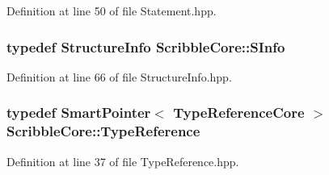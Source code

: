 Definition at line 50 of file Statement.\-hpp.

\hypertarget{namespace_scribble_core_a3a14a97bb67cd5efa082d8dda7595cca}{
\subsubsection[{S\-Info}]{\setlength{\rightskip}{0pt plus 5cm}typedef {\bf Structure\-Info} {\bf Scribble\-Core\-::\-S\-Info}}}\label{namespace_scribble_core_a3a14a97bb67cd5efa082d8dda7595cca}


Definition at line 66 of file Structure\-Info.\-hpp.

\hypertarget{namespace_scribble_core_a0e685a305b14aa5f0504df1369ba270b}{
\subsubsection[{Type\-Reference}]{\setlength{\rightskip}{0pt plus 5cm}typedef {\bf Smart\-Pointer}$<$ {\bf Type\-Reference\-Core} $>$ {\bf Scribble\-Core\-::\-Type\-Reference}}}\label{namespace_scribble_core_a0e685a305b14aa5f0504df1369ba270b}


Definition at line 37 of file Type\-Reference.\-hpp.



